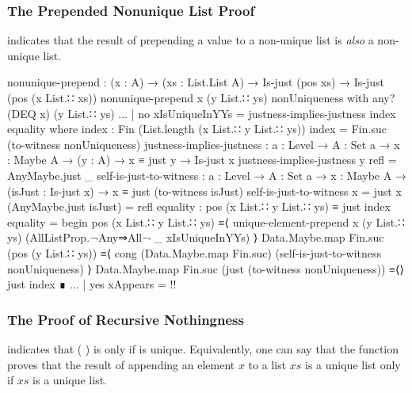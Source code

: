 \documentclass{report}
\begin{document}
\subsubsection{The Prepended Nonunique List Proof}
 indicates that the result of prepending a value to a non-unique list is \emph{also} a non-unique list.

\begin{code}
    nonunique-prepend :
      (x : A) →
      (xs : List.List A) →
      Is-just (pos xs) →
      Is-just (pos (x List.∷ xs))
    nonunique-prepend x (y List.∷ ys) nonUniqueness with any? (DEQ x) (y List.∷ ys)
    ... | no xIsUniqueInYYs = justness-implies-justness index equality
      where
      index : Fin (List.length (x List.∷ y List.∷ ys))
      index = Fin.suc (to-witness nonUniqueness)
      justness-implies-justness :
        {a : Level} →
        {A : Set a} →
        {x : Maybe A} →
        (y : A) →
        x ≡ just y →
        Is-just x
      justness-implies-justness y refl = AnyMaybe.just _
      self-is-just-to-witness :
        {a : Level} →
        {A : Set a} →
        {x : Maybe A} →
        (isJust : Is-just x) →
        x ≡ just (to-witness isJust)
      self-is-just-to-witness {x = just x} (AnyMaybe.just isJust) = refl
      equality : pos (x List.∷ y List.∷ ys) ≡ just index
      equality = begin
        pos (x List.∷ y List.∷ ys)
          ≡⟨ unique-element-prepend x (y List.∷ ys)
                                    (AllListProp.¬Any⇒All¬ _ xIsUniqueInYYs) ⟩
        Data.Maybe.map Fin.suc (pos (y List.∷ ys))
          ≡⟨ cong (Data.Maybe.map Fin.suc) (self-is-just-to-witness nonUniqueness) ⟩
        Data.Maybe.map Fin.suc (just (to-witness nonUniqueness))
          ≡⟨⟩
        just index ∎
    ... | yes xAppears = {!!}
\end{code}

\subsubsection{The Proof of Recursive Nothingness}
 indicates that  \AgdaSymbol(  \AgdaSymbol) is  only if  is unique.  Equivalently, one can say that the function proves that the result of appending an element \(x\) to a list \(xs\) is a unique list only if \(xs\) is a unique list.
\end{document}
